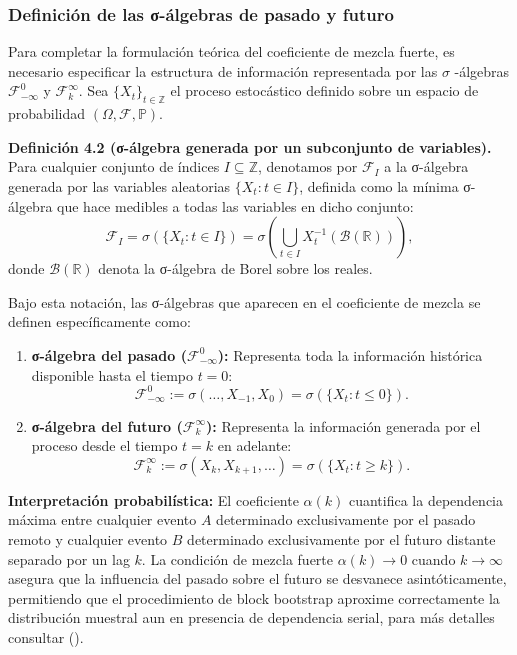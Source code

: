 \documentclass[
  spanish,
  us-letterpaper,
]{scrreprt}
\numberwithin{equation}{section}
\begin{document}
\subsubsection{Definición de las σ-álgebras de pasado y
futuro}\label{definiciuxf3n-de-las-ux3c3-uxe1lgebras-de-pasado-y-futuro}

Para completar la formulación teórica del coeficiente de mezcla fuerte,
es necesario especificar la estructura de información representada por
las \(\sigma\) -álgebras \(\mathcal{F}_{-\infty}^0\) y
\(\mathcal{F}_k^\infty\). Sea \(\{X_t\}_{t \in \mathbb{Z}}\) el proceso
estocástico definido sobre un espacio de probabilidad
\((\Omega, \mathcal{F}, \mathbb{P})\).

\textbf{Definición 4.2 (σ-álgebra generada por un subconjunto de
variables).} Para cualquier conjunto de índices
\(I \subseteq \mathbb{Z}\), denotamos por \(\mathcal{F}_I\) a la
σ-álgebra generada por las variables aleatorias \(\{X_t : t \in I\}\),
definida como la mínima σ-álgebra que hace medibles a todas las
variables en dicho conjunto: \[
\mathcal{F}_I = \sigma\left(\{X_t : t \in I\}\right) = \sigma\left(\bigcup_{t \in I} X_t^{-1}(\mathcal{B}(\mathbb{R}))\right),
\] donde \(\mathcal{B}(\mathbb{R})\) denota la σ-álgebra de Borel sobre
los reales.

Bajo esta notación, las σ-álgebras que aparecen en el coeficiente de
mezcla se definen específicamente como:

\begin{enumerate}
\def\labelenumi{\arabic{enumi}.}
\item
  \textbf{σ-álgebra del pasado (\(\mathcal{F}_{-\infty}^0\)):}
  Representa toda la información histórica disponible hasta el tiempo
  \(t=0\): \[
  \mathcal{F}_{-\infty}^0 := \sigma\left(\dots, X_{-1}, X_0\right) = \sigma\left(\{X_t : t \leq 0\}\right).
  \]
\item
  \textbf{σ-álgebra del futuro (\(\mathcal{F}_k^\infty\)):} Representa
  la información generada por el proceso desde el tiempo \(t=k\) en
  adelante: \[
  \mathcal{F}_k^\infty := \sigma\left(X_k, X_{k+1}, \dots\right) = \sigma\left(\{X_t : t \geq k\}\right).
  \]
\end{enumerate}

\textbf{Interpretación probabilística:} El coeficiente \(\alpha(k)\)
cuantifica la dependencia máxima entre cualquier evento \(A\)
determinado exclusivamente por el pasado remoto y cualquier evento \(B\)
determinado exclusivamente por el futuro distante separado por un lag
\(k\). La condición de mezcla fuerte \(\alpha(k) \to 0\) cuando
\(k \to \infty\) asegura que la influencia del pasado sobre el futuro se
desvanece asintóticamente, permitiendo que el procedimiento de block
bootstrap aproxime correctamente la distribución muestral aun en
presencia de dependencia serial, para más detalles consultar
().
\end{document}
